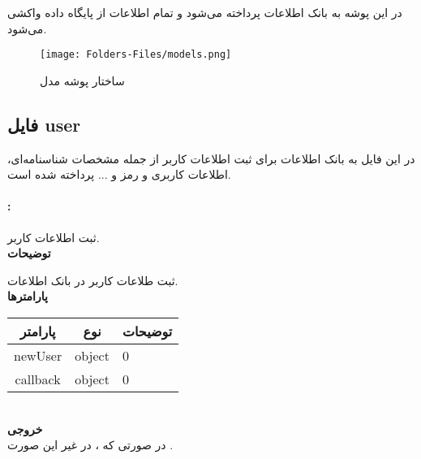 در این پوشه به بانک اطلاعات پرداخته می‌شود و تمام اطلاعات از پایگاه داده واکشی می‌شود.

\begin{figure}[H]
	\texttt{[image: Folders-Files/models.png]}
	\centering
	\caption{ساختار پوشه مدل}
	\label{fig:folder-models}
\end{figure}

\subsection{فایل user}
در این فایل به بانک اطلاعات برای ثبت اطلاعات کاربر از جمله مشخصات شناسنامه‌ای، اطلاعات کاربری و رمز و ... پرداخته شده است.

\paragraph{:}
ثبت اطلاعات کاربر.
\\
\textbf{توضیحات}
\hr
\begin{flushleft}
	\framebox[.9\textwidth][l]{
		\lr{
			\textcolor{type}{void}
			\textcolor{func}{setUser}
			\textcolor{symb}{(}
			\textcolor{type}{object}
			\textcolor{arg}{newUser}
			\textcolor{symb}{,}
			\textcolor{type}{object}
			\textcolor{arg}{callback}
			\textcolor{symb}{);}
		}
	}
\end{flushleft}
ثبت طلاعات کاربر در بانک اطلاعات.
\\
\textbf{پارامترها}
\hr \\[10pt]
\begin{tabular}{|m{4cm}|m{3cm}|m{10cm}|}
	\hline
	\multicolumn{1}{|c}{پارامتر}
	&
	\multicolumn{1}{|c}{نوع}
	&
	\multicolumn{1}{|c|}{توضیحات}
	\\
	\hline
	\multicolumn{1}{|c}{newUser}
	&
	\multicolumn{1}{|c|}{object}
	&
	0
	\\
	\hline
	\multicolumn{1}{|c}{callback}
	&
	\multicolumn{1}{|c|}{object}
	&
	0
	\\
	\hline
\end{tabular}
\\[10pt]
\textbf{خروجی}
\hr \\
در صورتی که ، در غیر این صورت .


